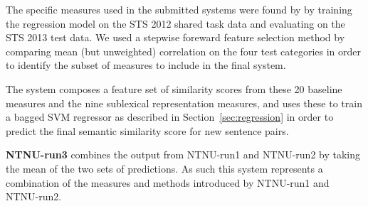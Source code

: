
The specific measures used in the submitted systems were found by by training the regression model on the STS 2012 shared task data and evaluating on the STS 2013 test data. We used a stepwise foreward feature selection method by comparing mean (but unweighted) correlation on the four test categories in order to identify the subset of measures to include in the final system.

The system composes a feature set of similarity scores from these 20 baseline measures and the nine sublexical representation measures, and uses these to train a bagged SVM regressor as described in Section~\ref{sec:regression} in order to predict the final semantic similarity score for new sentence pairs.

{\bf NTNU-run3} combines the output from NTNU-run1 and NTNU-run2 by taking the mean of the two sets of predictions. 
As such this system represents a combination of the measures and methods introduced by NTNU-run1 and NTNU-run2.


